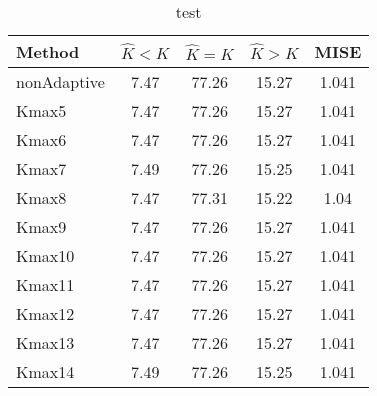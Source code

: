 \begin{table}[ht]
\centering
\begin{tabular}{l|cccc}
  \hline
Method & $\hat{K} < K$ & $\hat{K} = K$ & $\hat{K} > K$ & MISE \\ 
  \hline
nonAdaptive &  7.47 & 77.26 & 15.27 & 1.041 \\ 
  Kmax5 &  7.47 & 77.26 & 15.27 & 1.041 \\ 
  Kmax6 &  7.47 & 77.26 & 15.27 & 1.041 \\ 
  Kmax7 &  7.49 & 77.26 & 15.25 & 1.041 \\ 
  Kmax8 &  7.47 & 77.31 & 15.22 &  1.04 \\ 
  Kmax9 &  7.47 & 77.26 & 15.27 & 1.041 \\ 
  Kmax10 &  7.47 & 77.26 & 15.27 & 1.041 \\ 
  Kmax11 &  7.47 & 77.26 & 15.27 & 1.041 \\ 
  Kmax12 &  7.47 & 77.26 & 15.27 & 1.041 \\ 
  Kmax13 &  7.47 & 77.26 & 15.27 & 1.041 \\ 
  Kmax14 &  7.49 & 77.26 & 15.25 & 1.041 \\ 
   \hline
\end{tabular}
\caption{test} 
\end{table}

